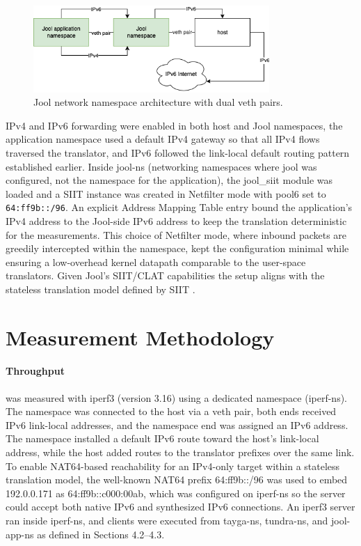 \begin{figure}[H]
    \centering
    \caption{Jool network namespace architecture with dual veth pairs.}
    \label{fig:jool_architecture}
    \includegraphics[width=0.8\textwidth]{resources/images/updatedjooldiagram.png}
\end{figure}

IPv4 and IPv6 forwarding were enabled in both host and Jool namespaces, the application namespace used a default IPv4 gateway so that all IPv4 flows traversed the translator, and IPv6 followed the link-local default routing pattern established earlier. Inside jool-ns (networking namespaces where jool was configured, not the namespace for the application), the jool\_siit module was loaded and a SIIT instance was created in Netfilter mode with pool6 set to \texttt{64:ff9b::/96}. An explicit Address Mapping Table entry bound the application’s IPv4 address to the Jool-side IPv6 address to keep the translation deterministic for the measurements. This choice of Netfilter mode, where inbound packets are greedily intercepted within the namespace, kept the configuration minimal while ensuring a low-overhead kernel datapath comparable to the user-space translators\cite{jool_introduction}. Given Jool’s SIIT/CLAT capabilities the setup aligns with the stateless translation model defined by SIIT \cite{jool_introduction,rfc7915}.


\section{Measurement Methodology}
\paragraph{Throughput} was measured with iperf3 (version 3.16) using a dedicated namespace (iperf-ns). The namespace was connected to the host via a veth pair, both ends received IPv6 link-local addresses, and the namespace end was assigned an IPv6 address. The namespace installed a default IPv6 route toward the host’s link-local address, while the host added routes to the translator prefixes over the same link. To enable NAT64-based reachability for an IPv4-only target within a stateless translation model, the well-known NAT64 prefix 64:ff9b::/96 was used to embed 192.0.0.171 as 64:ff9b::c000:00ab, which was configured on iperf-ns so the server could accept both native IPv6 and synthesized IPv6 connections\cite{rfc7915}. An iperf3 server ran inside iperf-ns, and clients were executed from tayga-ns, tundra-ns, and jool-app-ns as defined in Sections 4.2–4.3.

